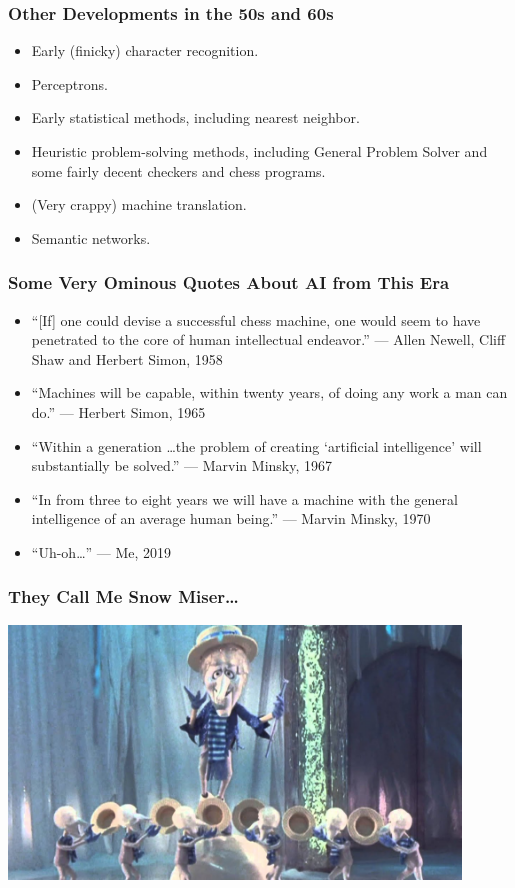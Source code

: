 \documentclass[10pt]{beamer}
\begin{document}
  \begin{frame}
    \frametitle{Other Developments in the 50s and 60s}
    \begin{itemize}
      \item Early (finicky) character recognition.
      \pause
      \item Perceptrons.
      \pause
      \item Early statistical methods, including nearest neighbor.
      \pause
      \item Heuristic problem-solving methods, including General Problem
        Solver and some fairly decent checkers and chess programs.
      \pause
      \item (Very crappy) machine translation.
      \pause
      \item Semantic networks.
    \end{itemize}
  \end{frame}

  \begin{frame}
    \frametitle{Some Very Ominous Quotes About AI from This Era}

    \begin{itemize}
      \item ``[If] one could devise a successful chess machine, one would seem
        to have penetrated to the core of human intellectual endeavor.'' ---
        Allen Newell, Cliff Shaw and Herbert Simon, 1958
      \item ``Machines will be capable, within twenty years, of doing any work
        a man can do.'' --- Herbert Simon, 1965
      \item ``Within a generation \ldots the problem of creating `artificial
        intelligence' will substantially be solved.'' --- Marvin Minsky, 1967
      \item ``In from three to eight years we will have a machine with the
        general intelligence of an average human being.'' --- Marvin Minsky,
        1970
      \pause
      \item ``Uh-oh\ldots'' --- Me, 2019
    \end{itemize}
  \end{frame}

  \begin{frame}
    \frametitle{They Call Me Snow Miser\ldots}

    \includegraphics[width=0.9\textwidth]{snow-miser.jpg}
  \end{frame}
\end{document}
